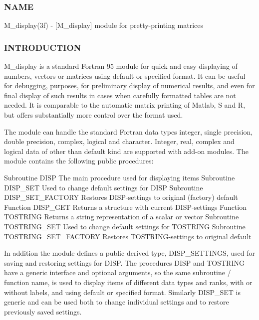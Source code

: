 \subsubsection*{N\+A\+ME}

M\+\_\+display(3f) -\/ \mbox{[}M\+\_\+display\mbox{]} module for pretty-\/printing matrices 

\subsubsection*{I\+N\+T\+R\+O\+D\+U\+C\+T\+I\+ON}

M\+\_\+display is a standard Fortran 95 module for quick and easy displaying of numbers, vectors or matrices using default or specified format. It can be useful for debugging, purposes, for preliminary display of numerical results, and even for final display of such results in cases when carefully formatted tables are not needed. It is comparable to the automatic matrix printing of Matlab, S and R, but offers substantially more control over the format used.

The module can handle the standard Fortran data types integer, single precision, double precision, complex, logical and character. Integer, real, complex and logical data of other than default kind are supported with add-\/on modules. The module contains the following public procedures\+: \begin{DoxyVerb}  Subroutine DISP                  The main procedure used for displaying items
  Subroutine DISP_SET              Used to change default settings for DISP
  Subroutine DISP_SET_FACTORY      Restores DISP-settings to original (factory) default
  Function DISP_GET                Returns a structure with current DISP-settings
  Function TOSTRING                Returns a string representation of a scalar or vector
  Subroutine TOSTRING_SET          Used to change default settings for TOSTRING
  Subroutine TOSTRING_SET_FACTORY  Restores TOSTRING-settings to original default
\end{DoxyVerb}


In addition the module defines a public derived type, D\+I\+S\+P\+\_\+\+S\+E\+T\+T\+I\+N\+GS, used for saving and restoring settings for D\+I\+SP. The procedures D\+I\+SP and T\+O\+S\+T\+R\+I\+NG have a generic interface and optional arguments, so the same subroutine / function name, is used to display items of different data types and ranks, with or without labels, and using default or specified format. Similarly D\+I\+S\+P\+\_\+\+S\+ET is generic and can be used both to change individual settings and to restore previously saved settings.


